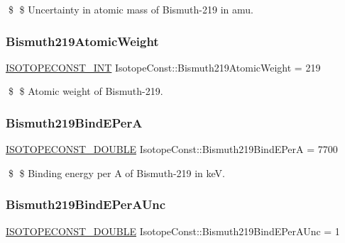 \$ \$ Uncertainty in atomic mass of Bismuth-\/219 in amu. \mbox{\label{group___isotope_const-_bismuth-_bi219_gaae028afc5e77c86cfb969df95283714e}} 
\subsubsection{\texorpdfstring{Bismuth219\+Atomic\+Weight}{Bismuth219AtomicWeight}}
{\footnotesize\ttfamily \mbox{\hyperlink{group___isotope_const-_macros_ga5f18360b3e99483a35c32d789e62621c}{I\+S\+O\+T\+O\+P\+E\+C\+O\+N\+S\+T\+\_\+\+I\+NT}} Isotope\+Const\+::\+Bismuth219\+Atomic\+Weight = 219}

\$ \$ Atomic weight of Bismuth-\/219. \mbox{\label{group___isotope_const-_bismuth-_bi219_gaf19dee7db84c44af67e2d0f5469271f9}} 
\subsubsection{\texorpdfstring{Bismuth219\+Bind\+E\+PerA}{Bismuth219BindEPerA}}
{\footnotesize\ttfamily \mbox{\hyperlink{group___isotope_const-_macros_ga8f45a7272ce02c0b4c65c44636ed719a}{I\+S\+O\+T\+O\+P\+E\+C\+O\+N\+S\+T\+\_\+\+D\+O\+U\+B\+LE}} Isotope\+Const\+::\+Bismuth219\+Bind\+E\+PerA = 7700}

\$ \$ Binding energy per A of Bismuth-\/219 in keV. \mbox{\label{group___isotope_const-_bismuth-_bi219_ga4879ffa65c161e5d13778539e6833b83}} 
\subsubsection{\texorpdfstring{Bismuth219\+Bind\+E\+Per\+A\+Unc}{Bismuth219BindEPerAUnc}}
{\footnotesize\ttfamily \mbox{\hyperlink{group___isotope_const-_macros_ga8f45a7272ce02c0b4c65c44636ed719a}{I\+S\+O\+T\+O\+P\+E\+C\+O\+N\+S\+T\+\_\+\+D\+O\+U\+B\+LE}} Isotope\+Const\+::\+Bismuth219\+Bind\+E\+Per\+A\+Unc = 1}

